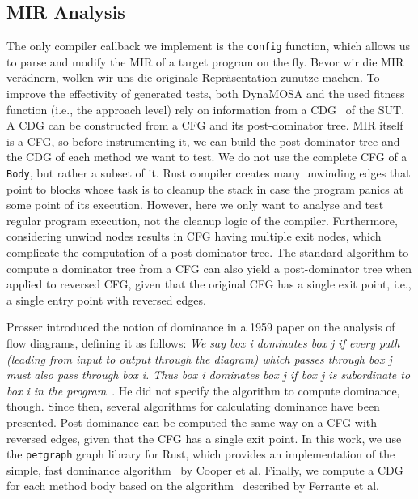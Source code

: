 \documentclass{article}
\begin{document}
\subsection{MIR Analysis}
The only compiler callback we implement is the \lstinline{config} function, which allows us to parse and modify the \ac{MIR} of a target program on the fly. Bevor wir die MIR verädnern, wollen wir uns die originale Repräsentation zunutze machen. To improve the effectivity of generated tests, both \ac{DynaMOSA} and the used fitness function (i.e., the approach level) rely on information from a \ac{CDG}~\cite{Ferrante1987} of the \ac{SUT}. A \ac{CDG} can be constructed from a \ac{CFG} and its post-dominator tree. \ac{MIR} itself is a \ac{CFG}, so before instrumenting it, we can build the post-dominator-tree and the \ac{CDG} of each method we want to test. We do not use the complete \ac{CFG} of a \lstinline{Body}, but rather a subset of it. Rust compiler creates many unwinding edges that point to blocks whose task is to cleanup the stack in case the program panics at some point of its execution. However, here we only want to analyse and test regular program execution, not the cleanup logic of the compiler. Furthermore, considering unwind nodes results in \ac{CFG} having multiple exit nodes, which complicate the computation of a post-dominator tree. The standard algorithm to compute a dominator tree from a \ac{CFG} can also yield a post-dominator tree when applied to reversed \ac{CFG}, given that the original \ac{CFG} has a single exit point, i.e., a single entry point with reversed edges. 

Prosser introduced the notion of dominance in a 1959 paper on the analysis of flow diagrams, defining it as follows:
\textit{We say box i dominates box j if every path (leading from input to output through the diagram) which passes through box j must also pass through box i. Thus box i dominates box j if box j is subordinate to box i in the program}~\cite{Prosser1959}. He did not specify the algorithm to compute dominance, though. Since then, several algorithms for calculating dominance have been presented. Post-dominance can be computed the same way on a \ac{CFG} with reversed edges, given that the \ac{CFG} has a single exit point. In this work, we use the \lstinline{petgraph} graph library for Rust, which provides an implementation of the simple, fast dominance algorithm~\cite{Cooper2001} by Cooper et al. Finally, we compute a \ac{CDG} for each method body based on the algorithm~\cite{Ferrante1987} described by Ferrante et al. 
\end{document}
